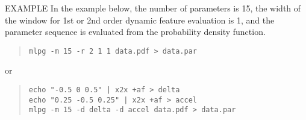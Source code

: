 \begin{qsection}{EXAMPLE}
	In the example below,
        the number of parameters is 15, the width of
        the window for 1st or 2nd order dynamic feature
        evaluation is 1, and the parameter sequence is
        evaluated from the probability density function.
 \begin{quote}
	\verb!mlpg -m 15 -r 2 1 1 data.pdf > data.par!
 \end{quote}
	or
 \begin{quote}
	\verb!echo "-0.5 0 0.5" | x2x +af > delta! \\
	\verb!echo "0.25 -0.5 0.25" | x2x +af > accel! \\
	\verb!mlpg -m 15 -d delta -d accel data.pdf > data.par!
 \end{quote}
\end{qsection}

